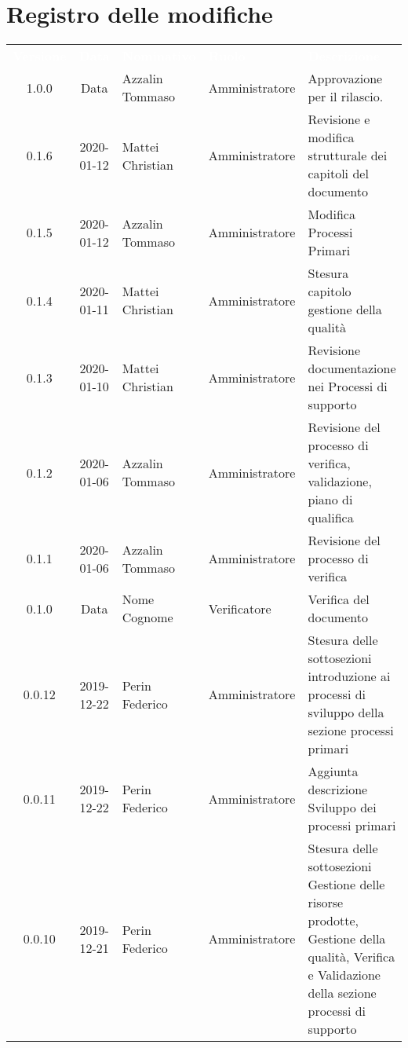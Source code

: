 \section*{Registro delle modifiche}
{
\renewcommand{\arraystretch}{1.5}
\centering
\begin{longtable}{c c  C{4cm}  C{3cm} C{4cm}}
\textcolor{white}{\textbf{Versione}} & \textcolor{white}{\textbf{Data}} & \textcolor{white}{\textbf{Nominativo}} & \textcolor{white}{\textbf{Ruolo}} & \textcolor{white}{\textbf{Descrizione}}\\	


1.0.0 & Data & Azzalin Tommaso & Amministratore & Approvazione per il rilascio.  \\

0.1.6 & 2020-01-12 & Mattei Christian & Amministratore & Revisione e modifica strutturale dei capitoli del documento \\

0.1.5 & 2020-01-12 & Azzalin Tommaso & Amministratore & Modifica Processi Primari \\

0.1.4 & 2020-01-11 & Mattei Christian & Amministratore & Stesura capitolo gestione della qualità \\

0.1.3 & 2020-01-10 & Mattei Christian & Amministratore & Revisione documentazione nei Processi di supporto \\

0.1.2 & 2020-01-06 & Azzalin Tommaso & Amministratore & Revisione del processo di verifica, validazione, piano di qualifica \\

0.1.1 & 2020-01-06 & Azzalin Tommaso & Amministratore & Revisione del processo di verifica \\

0.1.0 & Data & Nome Cognome & Verificatore & Verifica del documento \\

0.0.12 & 2019-12-22 & Perin Federico & Amministratore & Stesura delle sottosezioni introduzione ai processi di sviluppo della sezione processi primari\\

0.0.11 & 2019-12-22 & Perin Federico  & Amministratore & Aggiunta descrizione Sviluppo dei processi primari \\

0.0.10 & 2019-12-21 & Perin Federico & Amministratore & Stesura delle sottosezioni Gestione delle risorse prodotte, Gestione della qualità, Verifica e Validazione della sezione processi di supporto \\


\end{longtable}}
